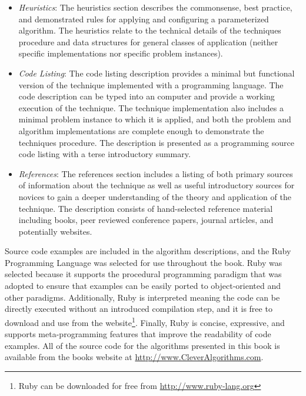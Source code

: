 \begin{bibunit}
\begin{itemize}
	\item \emph{Heuristics}: The heuristics section describes the commonsense, best practice, and demonstrated rules for applying and configuring a parameterized algorithm. The heuristics relate to the technical details of the techniques procedure and data structures for general classes of application (neither specific implementations nor specific problem instances).
	\item \emph{Code Listing}: The code listing description provides a minimal but functional version of the technique implemented with a programming language. The code description can be typed into an computer and provide a working execution of the technique. The technique implementation also includes a minimal problem instance to which it is applied, and both the problem and algorithm implementations are complete enough to demonstrate the techniques procedure. The description is presented as a programming source code listing with a terse introductory summary.
	\item \emph{References}: The references section includes a listing of both primary sources of information about the technique as well as useful introductory sources for novices to gain a deeper understanding of the theory and application of the technique. The description consists of hand-selected reference material including books, peer reviewed conference papers, journal articles, and potentially websites.
\end{itemize}

Source code examples are included in the algorithm descriptions, and the Ruby Programming Language was selected for use throughout the book. Ruby was selected because it supports the procedural programming paradigm that was adopted to ensure that examples can be easily ported to object-oriented and other paradigms. Additionally, Ruby is interpreted meaning the code can be directly executed without an introduced compilation step, and it is free to download and use from the website\footnote{Ruby can be downloaded for free from \url{http://www.ruby-lang.org}}. Finally, Ruby is concise, expressive, and supports meta-programming features that improve the readability of code examples. All of the source code for the algorithms presented in this book is available from the books website at \url{http://www.CleverAlgorithms.com}. 

% 
%

\end{bibunit}
